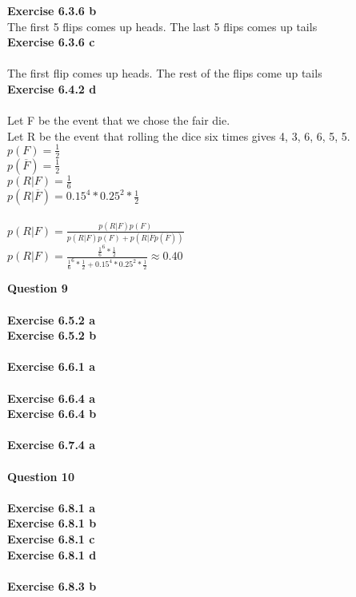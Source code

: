 \documentclass{article}
\begin{document}
\textbf{Exercise 6.3.6 b}\\
The first 5 flips comes up heads. The last 5 flips comes up tails\\
\textbf{Exercise 6.3.6 c}\\\\
The first flip comes up heads. The rest of the flips come up tails\\
\textbf{Exercise 6.4.2 d}\\\\
Let F be the event that we chose the fair die. \\
Let R be the event that rolling the dice six times gives 4, 3, 6, 6, 5, 5.\\
$p(F) = \frac{1}{2}$\\
$p(\overline{F}) = \frac{1}{2}$\\
$p(R|F) = \frac{1}{6}$\\
$p(R|\overline{F}) = 0.15^4 * 0.25^2 * \frac{1}{2}$\\\\
$p(R|F) = \frac{p(R|F)p(F)}{p(R|F)p(F)+p(R|\overline{F}p(\overline{F}))}$\\
$p(R|F) = \frac{\frac{1}{6}^6 * \frac{1}{2}}{\frac{1}{6}^6 * \frac{1}{2} + 0.15^4 * 0.25^2 * \frac{1}{2}} \approx 0.40$

\newpage
\noindent \textbf{Question 9}\\\\
\textbf{Exercise 6.5.2 a}\\
\textbf{Exercise 6.5.2 b}\\\\
\textbf{Exercise 6.6.1 a}\\\\
\textbf{Exercise 6.6.4 a}\\
\textbf{Exercise 6.6.4 b}\\\\
\textbf{Exercise 6.7.4 a}\\\\
\newpage
\noindent \textbf{Question 10}\\\\
\textbf{Exercise 6.8.1 a}\\
\textbf{Exercise 6.8.1 b}\\
\textbf{Exercise 6.8.1 c}\\
\textbf{Exercise 6.8.1 d}\\\\
\textbf{Exercise 6.8.3 b}\\
\end{document}
